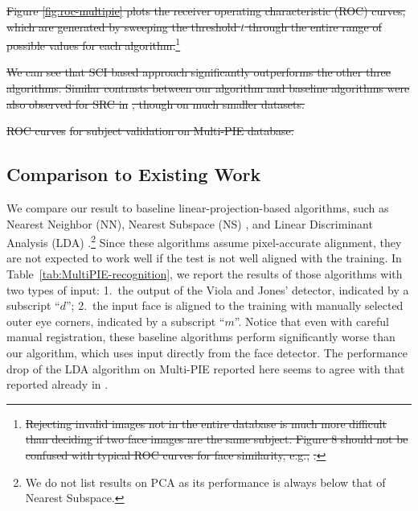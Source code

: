 \documentclass[12pt,journal,draftcls,letterpaper,onecolumn]{IEEEtran}
\providecommand{\DIFdel}[1]{{\protect\color{red}\sout{#1}}}                      %
\providecommand{\DIFdelend}{} %
\begin{document}
\DIFdel{Figure \ref{fig:roc-multipie} plots the receiver operating
characteristic (ROC) curves, which are generated by sweeping
the threshold $t$ through the entire range of possible values
for each algorithm.}\footnote{\DIFdel{Rejecting invalid images not in
the entire database is much more difficult than deciding if two
face images are the same subject. Figure 8 should not be
confused with typical ROC curves for face similarity, e.g.,
}%
\DIFdel{.}} %
\addtocounter{footnote}{-1}%
\DIFdel{We can see that SCI based approach
significantly outperforms the other three algorithms. Similar
contrasts between our algorithm and baseline algorithms were
also observed for SRC in }%
\DIFdel{, though on much
smaller datasets.
}%

{%
\DIFdel{ROC curves}%
\DIFdel{for subject validation on Multi-PIE database.}}%

\DIFdelend \subsection{Comparison to Existing Work}
We compare our result to baseline linear-projection-based
algorithms, such as Nearest Neighbor (NN), Nearest Subspace
(NS) \cite{Lee2005-PAMI}, and Linear Discriminant Analysis
(LDA) \cite{Belhumeur1997-PAMI}.\footnote{We do not list
results on PCA \cite{Turk1991-CVPR} as its performance is
always below that of Nearest Subspace.} Since these algorithms
assume pixel-accurate alignment, they are not expected to work
well if the test is not well aligned with the training. In
Table~\ref{tab:MultiPIE-recognition}, we report the results of
those algorithms with two types of input: 1.\ the output of the
Viola and Jones' detector, indicated by a subscript ``$d$'';
2.\ the input face is aligned to the training with manually
selected outer eye corners, indicated by a subscript ``$m$''.
Notice that even with careful manual registration, these
baseline algorithms perform significantly worse than our
algorithm, which uses input directly from the face detector.
The performance drop of the LDA algorithm on Multi-PIE reported here
seems to agree with that reported already in
\cite{Gross2008-FGR}.
\end{document}
